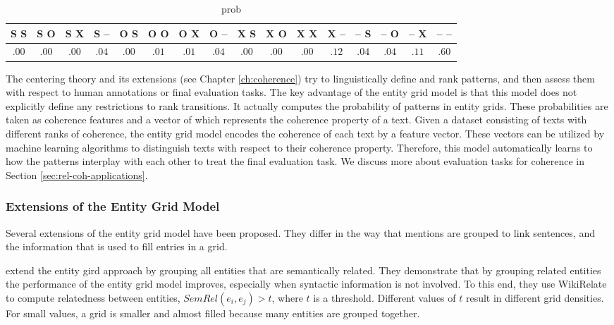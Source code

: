 \begin{table}
	\begin{center}
		\resizebox{\columnwidth}{!}
		{%
			\begin{tabular}{@{}cccccccccccccccc@{}}
				\hline
				S S & S O & S X & S -- & O S & O O & O X & O -- & X S & X O & X X & X -- & -- S & -- O & -- X & -- -- \\
				\hline
				$.00$ & $.00$ & $.00$ & $.04$ & $.00$ & $.01$ & $.01$ & $.04$ & $.00$ & $.00$ & $.00$ & $.12$ & $.04$ & $.04$ & $.11$ & $.60$ \\
				\hline
			\end{tabular}
		}%
	\end{center}
	\caption{prob}
	\label{tab:rel-egrid-probs}
\end{table}

The centering theory and its extensions (see Chapter \ref{ch:coherence}) try to linguistically define and rank patterns, and then assess them with respect to human annotations or final evaluation tasks. 
The key advantage of the entity grid model is that this model does not explicitly define any restrictions to rank transitions. 
It actually computes the probability of patterns in entity grids. 
These probabilities are taken as coherence features and a vector of which represents the coherence property of a text. 
Given a dataset consisting of texts with different ranks of coherence, the entity grid model encodes the coherence of each text by a feature vector.  
These vectors can be utilized by machine learning algorithms to distinguish texts with respect to their coherence property. 
Therefore, this model automatically learns to how the patterns interplay with each other to treat the final evaluation task. 
We discuss more about evaluation tasks for coherence in Section \ref{sec:rel-coh-applications}.

\subsubsection{Extensions of the Entity Grid Model}
%
Several extensions of the entity grid model have been proposed. 
They differ in the way that mentions are grouped to link sentences, and the information that is used to fill entries in a grid. 

 extend the entity gird approach by grouping all entities that are semantically related.  
They demonstrate that by grouping related entities the performance of the entity grid model improves, especially when syntactic information is not involved. 
To this end, they use WikiRelate \cite{strube.aaai06} to compute relatedness between entities, $SemRel(e_i,e_j) >t$, where $t$ is a threshold.
Different values of $t$ result in different grid densities. 
For small values, a grid is smaller and almost filled because many entities are grouped together. 

